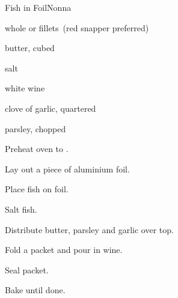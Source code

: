 \begin{recipe}{Fish in Foil}{Nonna}{}

\begin{ingredients}
\item whole  or fillets~(red snapper preferred)
\item butter, cubed
\item salt
\item white wine
\item clove of garlic, quartered
\item parsley, chopped
\end{ingredients}

\begin{directions}
\item Preheat oven to .
\item Lay out a piece of aluminium foil.
\item Place fish on foil.
\item Salt fish.
\item Distribute butter, parsley and garlic over top.
\item Fold a packet and pour in wine.
\item Seal packet.
\item Bake until done.
\end{directions}

\end{recipe}
